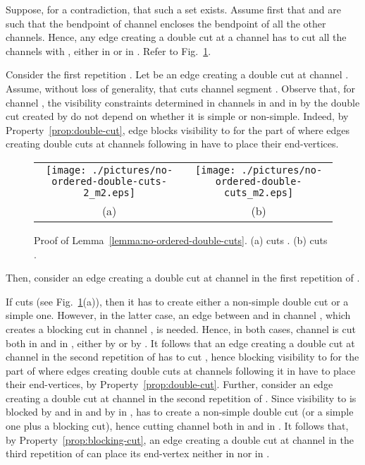 \documentclass[a4paper,10pt]{llncs}
\newcounter{prop}
\renewenvironment{proof}
{{\bf Proof:}}{\hspace*{\fill}\par\vspace{2mm}}
\begin{document}
\begin{proof}
Suppose, for a contradiction, that such a set  exists. Assume first that  and  are such that the bendpoint of channel  encloses the bendpoint of all the other channels. Hence, any edge creating a double cut at a channel  has to cut all the channels  with , either in  or in . Refer to Fig.~\ref{fig:no-ordered-double-cuts}.

Consider the first repetition . Let  be an edge creating a double cut at channel . Assume, without loss of generality, that  cuts channel segment . Observe that, for channel , the visibility constraints determined in channels  in  and in  by the double cut created by  do not depend on whether it is simple or non-simple. Indeed, by Property~\ref{prop:double-cut}, edge  blocks visibility to  for the part of  where edges creating double cuts at channels  following  in  have to place their end-vertices.

\begin{figure}[ht]
\begin{center}
\begin{tabular}{cc}
\mbox{\texttt{[image: ./pictures/no-ordered-double-cuts-2\_m2.eps]}} \hspace{0.1cm} &
\mbox{\texttt{[image: ./pictures/no-ordered-double-cuts\_m2.eps]}} \\
(a) & (b)\\
\end{tabular}
\caption{Proof of Lemma~\ref{lemma:no-ordered-double-cuts}. (a)  cuts . (b)  cuts .}\label{fig:no-ordered-double-cuts}
\end{center}
\end{figure}

Then, consider an edge  creating a double cut at channel  in the first repetition of .

If  cuts  (see Fig.~\ref{fig:no-ordered-double-cuts}(a)), then it has to create either a non-simple double cut or a simple one. However, in the latter case, an edge  between  and  in channel , which creates a blocking cut in channel , is needed. Hence, in both cases, channel  is cut both in  and in , either by  or by . It follows that an edge  creating a double cut at channel  in the second repetition of  has to cut , hence blocking visibility to  for the part of  where edges creating double cuts at channels  following it in  have to place their end-vertices, by Property~\ref{prop:double-cut}. Further, consider an edge  creating a double cut at channel  in the second repetition of . Since visibility to  is blocked by  and  in  and by  in ,  has to create a non-simple double cut (or a simple one plus a blocking cut), hence cutting channel  both in  and in . It follows that, by Property~\ref{prop:blocking-cut}, an edge  creating a double cut at channel  in the third repetition of  can place its end-vertex neither in  nor in .


\end{proof}
\end{document}
